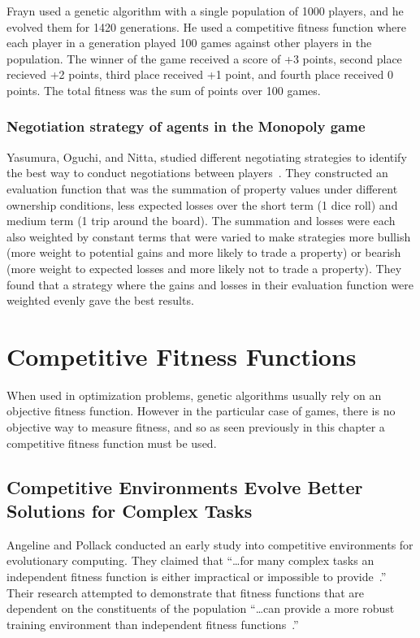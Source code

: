 Frayn used a genetic algorithm with a single population of 1000 players, and he
evolved them for 1420 generations. He used a competitive fitness function where
each player in a generation played 100 games against other players in the
population. The winner of the game received a score of +3 points, second place
recieved +2 points, third place received +1 point, and fourth place received 0
points. The total fitness was the sum of points over 100 games.

\subsubsection{Negotiation strategy of agents in the Monopoly game}
\label{3_trading}

Yasumura, Oguchi, and Nitta, studied different negotiating strategies to
identify the best way to conduct negotiations between
players~\cite{Yasumura2001Negotiate}. They constructed an evaluation function
that was the summation of property values under different ownership conditions,
less expected losses over the short term (1 dice roll) and medium term (1 trip
around the board). The summation and losses were each also weighted by constant
terms that were varied to make strategies more bullish (more weight to potential
gains and more likely to trade a property) or bearish (more weight to expected
losses and more likely not to trade a property). They found that a strategy
where the gains and losses in their evaluation function were weighted evenly
gave the best results.

\section{Competitive Fitness Functions}

When used in optimization problems, genetic algorithms usually rely on an
objective fitness function. However in the particular case of games, there is no
objective way to measure fitness, and so as seen previously in this chapter a
competitive fitness function must be used.

\subsection{Competitive Environments Evolve Better Solutions for Complex Tasks}

Angeline and Pollack conducted an early study into competitive environments for
evolutionary computing. They claimed that ``\ldots for many complex tasks an
independent fitness function is either impractical or impossible to
provide~\cite{Angeline:1993:CEE:645513.657590}.'' Their research attempted to
demonstrate that fitness functions that are dependent on the constituents of the
population ``\ldots can provide a more robust training environment than
independent fitness functions~\cite{Angeline:1993:CEE:645513.657590}.''

